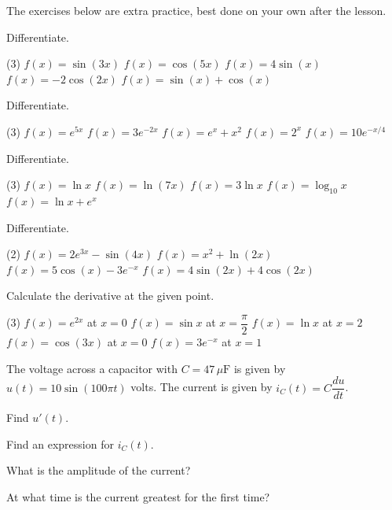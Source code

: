 The exercises below are extra practice, best done on your own after the lesson.

Differentiate.
\begin{delar}(3)
  \task $f(x) = \sin(3x)$
  \task $f(x) = \cos(5x)$
  \task $f(x) = 4\sin(x)$
  \task $f(x) = -2\cos(2x)$
  \task $f(x) = \sin(x) + \cos(x)$
\end{delar}

Differentiate.
\begin{delar}(3)
  \task $f(x) = e^{5x}$
  \task $f(x) = 3e^{-2x}$
  \task $f(x) = e^x + x^2$
  \task $f(x) = 2^x$
  \task $f(x) = 10e^{-x/4}$
\end{delar}

Differentiate.
\begin{delar}(3)
  \task $f(x) = \ln x$
  \task $f(x) = \ln(7x)$
  \task $f(x) = 3\ln x$
  \task $f(x) = \log_{10} x$
  \task $f(x) = \ln x + e^x$
\end{delar}

Differentiate.
\begin{delar}(2)
  \task $f(x) = 2e^{3x} - \sin(4x)$
  \task $f(x) = x^2 + \ln(2x)$
  \task $f(x) = 5\cos(x) - 3e^{-x}$
  \task $f(x) = 4\sin(2x) + 4\cos(2x)$
\end{delar}

Calculate the derivative at the given point.
\begin{delar}(3)
  \task $f(x) = e^{2x}$ at $x = 0$
  \task $f(x) = \sin x$ at $x = \dfrac{\pi}{2}$
  \task $f(x) = \ln x$ at $x = 2$
  \task $f(x) = \cos(3x)$ at $x = 0$
  \task $f(x) = 3e^{-x}$ at $x = 1$
\end{delar}

The voltage across a capacitor with $C = 47\,\mu\text{F}$ is given by $u(t) = 10\sin(100\pi t)$
volts. The current is given by $i_C(t) = C\dfrac{du}{dt}$.
\begin{parts}
  \item Find $u'(t)$.
  \item Find an expression for $i_C(t)$.
  \item What is the amplitude of the current?
  \item At what time is the current greatest for the first time?
\end{parts}

